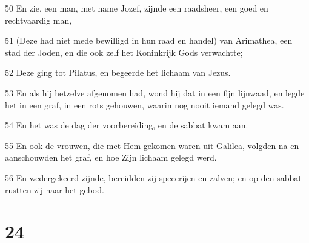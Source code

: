 \par 50 En zie, een man, met name Jozef, zijnde een raadsheer, een goed en rechtvaardig man,
\par 51 (Deze had niet mede bewilligd in hun raad en handel) van Arimathea, een stad der Joden, en die ook zelf het Koninkrijk Gods verwachtte;
\par 52 Deze ging tot Pilatus, en begeerde het lichaam van Jezus.
\par 53 En als hij hetzelve afgenomen had, wond hij dat in een fijn lijnwaad, en legde het in een graf, in een rots gehouwen, waarin nog nooit iemand gelegd was.
\par 54 En het was de dag der voorbereiding, en de sabbat kwam aan.
\par 55 En ook de vrouwen, die met Hem gekomen waren uit Galilea, volgden na en aanschouwden het graf, en hoe Zijn lichaam gelegd werd.
\par 56 En wedergekeerd zijnde, bereidden zij specerijen en zalven; en op den sabbat rustten zij naar het gebod.

\chapter{24}

